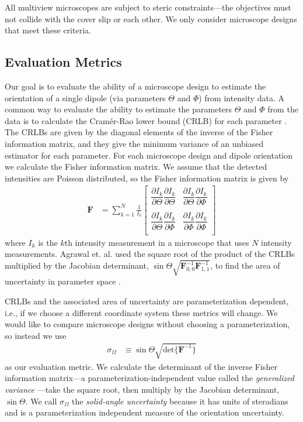 \documentclass[10pt]{article}
\providecommand{\mb}[1]{\mathbf{#1}}
\begin{document}
All multiview microscopes are subject to steric constraints---the objectives
must not collide with the cover slip or each other. We only consider microscope
designs that meet these criteria.

\subsection{Evaluation Metrics}\label{metrics}
Our goal is to evaluate the ability of a microscope design to estimate the
orientation of a single dipole (via parameters $\Theta$ and $\Phi$) from
intensity data. A common way to evaluate the ability to estimate the parameters
$\Theta$ and $\Phi$ from the data is to calculate the Cram\'er-Rao lower bound
(CRLB) for each parameter \cite{kay1993}. The CRLBs are given by the diagonal
elements of the inverse of the Fisher information matrix, and they give the
minimum variance of an unbiased estimator for each parameter. For each
microscope design and dipole orientation we calculate the Fisher information
matrix. We assume that the detected intensities are Poisson distributed, so the
Fisher information matrix is given by
\begin{align}
  \mb{F} &= \sum_{k=1}^N \frac{1}{I_k}
  \begin{bmatrix}
    \dfrac{\partial I_k}{\partial \Theta}\dfrac{\partial I_k}{\partial \Theta}&\dfrac{\partial I_k}{\partial \Theta}\dfrac{\partial I_k}{\partial \Phi}\\\\
    \dfrac{\partial I_k}{\partial \Theta}\dfrac{\partial I_k}{\partial \Phi}&\dfrac{\partial I_k}{\partial \Phi}\dfrac{\partial I_k}{\partial \Phi}\\    
  \end{bmatrix}
\end{align}
where $I_k$ is the $k$th intensity measurement in a microscope that uses $N$
intensity measurements. Agrawal et. al. used the square root of the product of
the CRLBs multiplied by the Jacobian determinant,
$\sin\Theta\sqrt{\mb{F}^{-1}_{0,0}\mb{F}^{-1}_{1,1}}$, to find the area of
uncertainty in parameter space \cite{agrawal2012}.

CRLBs and the associated area of uncertainty are parameterization dependent,
i.e., if we choose a different coordinate system these metrics will change. We
would like to compare microscope designs without choosing a parameterization, so
instead we use
\begin{align}
  \sigma_{\Omega} &\equiv \sin\Theta\sqrt{\text{det}\{\mb{F}^{-1}\}}
\end{align}
as our evaluation metric. We calculate the determinant of the inverse Fisher
information matrix---a parameterization-independent value called the
\emph{generalized variance} \cite{anderson1958}---take the square root, then
multiply by the Jacobian determinant, $\sin\Theta$. We call $\sigma_{\Omega}$
the \emph{solid-angle uncertainty} because it has units of steradians and is a
parameterization independent measure of the orientation uncertainty.
\end{document}
